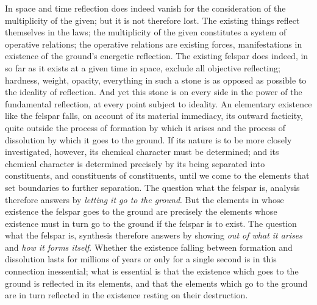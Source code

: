 \documentclass[12pt,a4paper]{book}
\begin{document}
In space and time reflection does indeed vanish for the consideration of the
multiplicity of the given; but it is not therefore lost. The existing things
reflect themselves in the laws; the multiplicity of the given constitutes a
system of operative relations; the operative relations are existing forces,
manifestations in existence of the ground's energetic reflection. The existing
felspar does indeed, in so far as it exists
at a given time in space, exclude all objective reflecting; hardness, weight,
opacity, everything in such a stone is as opposed as possible to the ideality
of reflection. And yet this stone is on every side in the power of the
fundamental reflection, at every point subject to ideality. An elementary
existence like the felspar falls, on account of its material immediacy, its
outward facticity, quite outside the process of formation by which it arises
and the process of dissolution by which it goes to the ground. If its nature is
to be more closely investigated, however, its chemical character must be
determined; and its chemical character is determined precisely by its being
separated into constituents, and constituents of
constituents, until we come to the elements that set boundaries to further
separation. The question what the felspar is, analysis therefore answers by
\emph{letting it go to the ground}. But the elements in whose existence the
felspar goes to the ground are precisely the elements whose existence must in
turn go to the ground if the felspar is to exist. The question what the felspar
is, synthesis therefore answers by showing \emph{out of what it arises} and
\emph{how it forms itself}. Whether the existence falling between formation and
dissolution lasts for millions of years or only for a single second is in this
connection inessential; what is essential is that the existence which goes to
the ground is reflected in its elements, and that the elements which go to the
ground are in turn reflected in the existence resting on their destruction.
\end{document}
